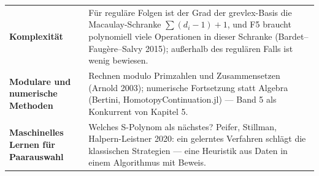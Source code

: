 \begin{forschung}
\begin{center}
{\small
\renewcommand{\arraystretch}{1.45}
\begin{tabular}{@{}P{3.0cm}P{5.2cm}@{}}
\toprule
\textbf{Komplexität} & Für reguläre Folgen ist der Grad der grevlex-Basis die Macaulay-Schranke $\sum(d_i - 1) + 1$, und F5 braucht polynomiell viele Operationen in dieser Schranke (Bardet--Faugère--Salvy 2015); außerhalb des regulären Falls ist wenig bewiesen.\\
\textbf{Modulare und numerische Methoden} & Rechnen modulo Primzahlen und Zusammensetzen (Arnold 2003); numerische Fortsetzung statt Algebra (Bertini, HomotopyContinuation.jl) --- Band 5 als Konkurrent von Kapitel 5.\\
\textbf{Maschinelles Lernen für Paarauswahl} & Welches S-Polynom als nächstes? Peifer, Stillman, Halpern-Leistner 2020: ein gelerntes Verfahren schlägt die klassischen Strategien --- eine Heuristik aus Daten in einem Algorithmus mit Beweis.\\
\bottomrule
\end{tabular}}
\end{center}

\begin{center}
\begin{minipage}{0.88\textwidth}
\end{minipage}
\end{center}
\end{forschung}

